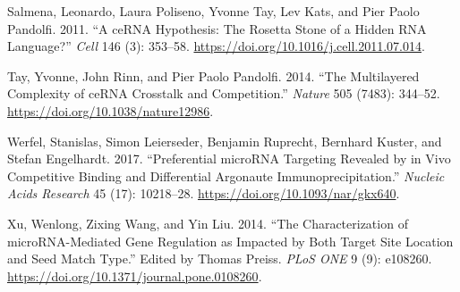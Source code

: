 \documentclass[]{article}
\begin{document}
\leavevmode\hypertarget{ref-salmena_cerna_2011}{}%
Salmena, Leonardo, Laura Poliseno, Yvonne Tay, Lev Kats, and Pier Paolo
Pandolfi. 2011. ``A ceRNA Hypothesis: The Rosetta Stone of a Hidden RNA
Language?'' \emph{Cell} 146 (3): 353--58.
\url{https://doi.org/10.1016/j.cell.2011.07.014}.

\leavevmode\hypertarget{ref-tay_multilayered_2014}{}%
Tay, Yvonne, John Rinn, and Pier Paolo Pandolfi. 2014. ``The
Multilayered Complexity of ceRNA Crosstalk and Competition.''
\emph{Nature} 505 (7483): 344--52.
\url{https://doi.org/10.1038/nature12986}.

\leavevmode\hypertarget{ref-werfel_preferential_2017}{}%
Werfel, Stanislas, Simon Leierseder, Benjamin Ruprecht, Bernhard Kuster,
and Stefan Engelhardt. 2017. ``Preferential microRNA Targeting Revealed
by in Vivo Competitive Binding and Differential Argonaute
Immunoprecipitation.'' \emph{Nucleic Acids Research} 45 (17): 10218--28.
\url{https://doi.org/10.1093/nar/gkx640}.

\leavevmode\hypertarget{ref-xu_characterization_2014}{}%
Xu, Wenlong, Zixing Wang, and Yin Liu. 2014. ``The Characterization of
microRNA-Mediated Gene Regulation as Impacted by Both Target Site
Location and Seed Match Type.'' Edited by Thomas Preiss. \emph{PLoS ONE}
9 (9): e108260. \url{https://doi.org/10.1371/journal.pone.0108260}.
\end{document}
